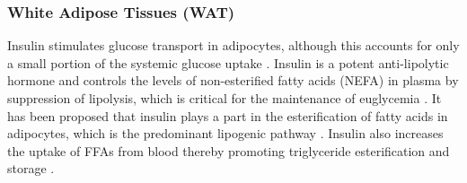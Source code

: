 \subsubsection{White Adipose Tissues (WAT)}
Insulin stimulates glucose transport in adipocytes, although this accounts for only a small portion of the systemic glucose uptake \textbf{\cite{leto_regulation_2012}}. Insulin is a potent anti-lipolytic hormone and controls the levels of non-esterified fatty acids (NEFA) in plasma by suppression of lipolysis, which is critical for the maintenance of euglycemia \textbf{\cite{dimitriadis_insulin_2011}}. It has been proposed that insulin plays a part in the esterification of fatty acids in adipocytes, which is the predominant lipogenic pathway \textbf{\cite{lewis_disordered_2002}}. Insulin also increases the uptake of FFAs from blood thereby promoting triglyceride esterification and storage \textbf{\cite{czech_insulin_2013}}.\\\\ 


